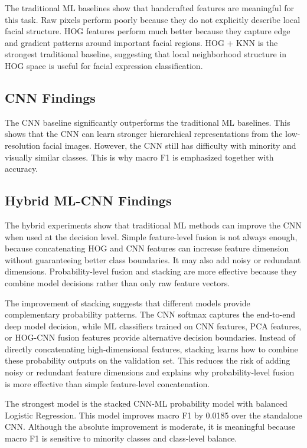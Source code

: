 \documentclass[conference]{IEEEtran}
\begin{document}
The traditional ML baselines show that handcrafted features are meaningful for
this task. Raw pixels perform poorly because they do not explicitly describe
local facial structure. HOG features perform much better because they capture
edge and gradient patterns around important facial regions. HOG + KNN is the
strongest traditional baseline, suggesting that local neighborhood structure in
HOG space is useful for facial expression classification.

\subsection{CNN Findings}

The CNN baseline significantly outperforms the traditional ML baselines. This
shows that the CNN can learn stronger hierarchical representations from the
low-resolution facial images. However, the CNN still has difficulty with
minority and visually similar classes. This is why macro F1 is emphasized
together with accuracy.

\subsection{Hybrid ML-CNN Findings}

The hybrid experiments show that traditional ML methods can improve the CNN
when used at the decision level. Simple feature-level fusion is not always
enough, because concatenating HOG and CNN features can increase feature
dimension without guaranteeing better class boundaries. It may also add noisy
or redundant dimensions. Probability-level fusion and stacking are more
effective because they combine model decisions rather than only raw feature
vectors.

The improvement of stacking suggests that different models provide
complementary probability patterns. The CNN softmax captures the end-to-end
deep model decision, while ML classifiers trained on CNN features, PCA features,
or HOG-CNN fusion features provide alternative decision boundaries. Instead of
directly concatenating high-dimensional features, stacking learns how to combine
these probability outputs on the validation set. This reduces the risk of
adding noisy or redundant feature dimensions and explains why probability-level
fusion is more effective than simple feature-level concatenation.

The strongest model is the stacked CNN-ML probability model with balanced
Logistic Regression. This model improves macro F1 by 0.0185 over the standalone
CNN. Although the absolute improvement is moderate, it is meaningful because
macro F1 is sensitive to minority classes and class-level balance.
\end{document}
